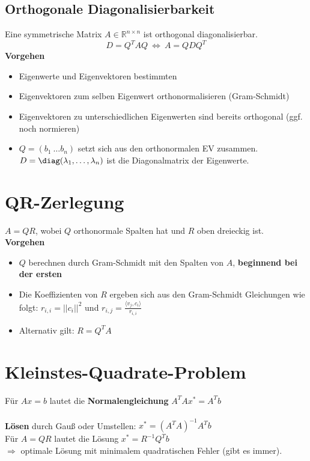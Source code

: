 \documentclass[german, 6pt]{latex4ei/latex4ei_sheet}
\begin{document}
\subsection{Orthogonale Diagonalisierbarkeit}
Eine symmetrische Matrix $A \in \mathbb{R}^{n \times n}$ ist orthogonal diagonalisierbar.
\begin{equation*}
D=Q^{T}AQ \ \Leftrightarrow \ A=QDQ^{T}
\end{equation*}
\textbf{Vorgehen}
\begin{itemize}
\item Eigenwerte und Eigenvektoren bestimmten
\item Eigenvektoren zum selben Eigenwert orthonormalisieren (Gram-Schmidt)
\item Eigenvektoren zu unterschiedlichen Eigenwerten sind bereits orthogonal (ggf. noch normieren)
\item $Q=(b_1 \ \dots b_n)$ setzt sich aus den orthonormalen EV zusammen. \\
$D=\diag(\lambda_1,\dots,\lambda_n)$ ist die Diagonalmatrix der Eigenwerte.
\end{itemize}
\section{QR-Zerlegung}
\begin{minipage}{\columnwidth}
$A = QR$, wobei $Q$ orthonormale Spalten hat und $R$ oben dreieckig ist.\\
\textbf{Vorgehen}
\begin{itemize}\itemsep0pt
 \item $Q$ berechnen durch Gram-Schmidt mit den Spalten von $A$, \textbf{beginnend bei der ersten}
 \item Die Koeffizienten von $R$ ergeben sich aus den Gram-Schmidt Gleichungen wie folgt: $r_{i,i}=||c_i||^2$ und $r_{i,j}=\frac{\langle v_j,c_i \rangle}{r_{i,i}}$
 \item Alternativ gilt: $R = Q^TA$
\end{itemize}
\end{minipage}
\section{Kleinstes-Quadrate-Problem}
Für $Ax = b$ lautet die
\textbf{Normalengleichung}
$A^TAx^* = A^Tb$\\
\\
\textbf{Lösen} durch Gauß oder Umstellen: $x^* = (A^TA)^{-1}A^Tb$\\
Für  $A=QR$ lautet die Lösung $x^* = R^{-1}Q^Tb$\\
$\Rightarrow$ optimale Lösung mit minimalem quadratischen Fehler (gibt es immer).
\end{document}
